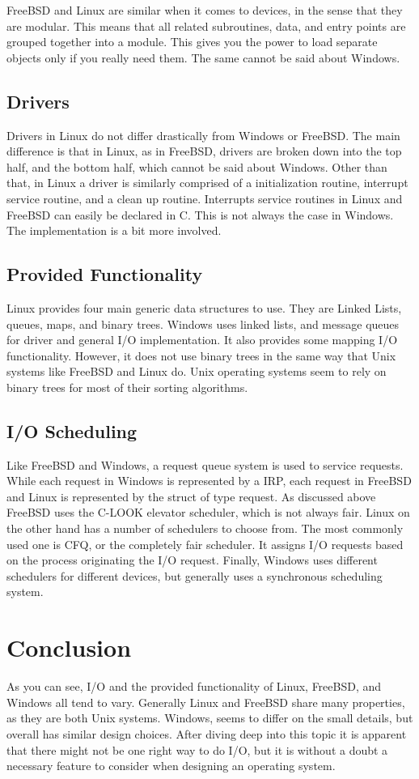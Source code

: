 \documentclass[letterpaper,10pt,titlepage,draftclsnofoot,onecolumn]{IEEEtran}
\begin{document}
FreeBSD and Linux are similar when it comes to devices, in the sense that they are modular. This means that all related subroutines, data, and entry points are grouped together into a module. \cite{linux} This gives you the power to load separate objects only if you really need them. The same cannot be said about Windows. 

\subsection{Drivers}
Drivers in Linux do not differ drastically from Windows or FreeBSD. The main difference is that in Linux, as in FreeBSD, drivers are broken down into the top half, and the bottom half, which cannot be said about Windows. Other than that, in Linux a driver is similarly comprised of a initialization routine, interrupt service routine, and a clean up routine. Interrupts service routines in Linux and FreeBSD can easily be declared in C. This is not always the case in Windows. The implementation is a bit more involved.

\subsection{Provided Functionality}
Linux provides four main generic data structures to use. They are Linked Lists, queues, maps, and binary trees. Windows uses linked lists, and message queues for driver and general I/O implementation. It also provides some mapping I/O functionality. However, it does not use binary trees in the same way that Unix systems like FreeBSD and Linux do. Unix operating systems seem to rely on binary trees for most of their sorting algorithms. 

\subsection{I/O Scheduling}
Like FreeBSD and Windows, a request queue system is used to service requests. While each request in Windows is represented by a IRP, each request in FreeBSD and Linux is represented by the struct of type request. As discussed above FreeBSD uses the C-LOOK elevator scheduler, which is not always fair. Linux on the other hand has a number of schedulers to choose from. The most commonly used one is CFQ, or the completely fair scheduler. It assigns I/O requests based on the process originating the I/O request. \cite{linux} Finally, Windows uses different schedulers for different devices, but generally uses a synchronous scheduling system. 


\section{Conclusion}
As you can see, I/O and the provided functionality of Linux, FreeBSD, and Windows all tend to vary. Generally Linux and FreeBSD share many properties, as they are both Unix systems. Windows, seems to differ on the small details, but overall has similar design choices. After diving deep into this topic it is apparent that there might not be one right way to do I/O, but it is without a doubt a necessary feature to consider when designing an operating system. 


\end{document}
